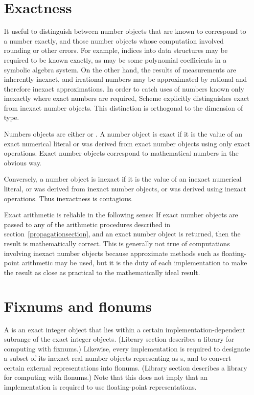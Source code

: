 \section{Exactness}
\label{exactly}

It useful to distinguish between number objects
that are known to correspond to a number exactly, and those number
objects whose computation involved rounding or other errors.  For
example, indices into data structures may be required to be known
exactly, as may be some polynomial coefficients in a symbolic algebra
system.  On the other hand, the results of measurements are inherently
inexact, and irrational numbers may be approximated by rational and
therefore inexact approximations.  In order to catch uses of numbers
known only inexactly where exact numbers are required, Scheme
explicitly distinguishes exact from inexact number objects.  This
distinction is orthogonal to the dimension of type.

Numbers objects are either  or .  A
number object is exact if it is the value of an exact numerical
literal or was derived from exact number objects using only exact
operations.  Exact number objects correspond to mathematical numbers
in the obvious way.

Conversely, a number object is inexact if it is the value of an
inexact numerical literal, or was derived from inexact number objects,
or was derived using inexact operations.  Thus inexactness is
contagious.

Exact arithmetic is reliable in the following sense: If exact number
objects are passed to any of the arithmetic procedures described in
section~\ref{propagationsection}, and an exact number object is
returned, then the result is mathematically correct.  This is
generally not true of computations involving inexact number objects
because approximate methods such as floating-point arithmetic may be
used, but it is the duty of each implementation to make the result as
close as practical to the mathematically ideal result.

\section{Fixnums and flonums}

A  is an exact integer object that lies
within a certain implementation-dependent subrange of the
exact integer objects. (Library section  describes a
library for computing with fixnums.)
Likewise, every implementation is required
to designate a subset of its inexact real number objects representing as s, and
to convert certain external representations into flonums.  
(Library section  describes a library for
computing with flonums.)  Note that
this does not imply that an implementation is required to use
floating-point representations.

